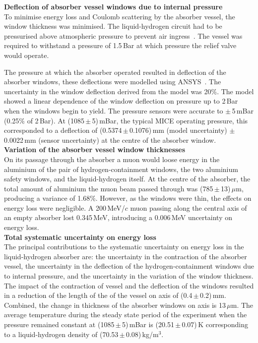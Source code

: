 \noindent\textbf{Deflection of absorber vessel windows due to internal
  pressure} \\
\noindent
To minimise energy loss and Coulomb scattering by the absorber vessel,
the window thickness was minimised.
The liquid-hydrogen circuit had to be pressurised
above atmospheric pressure to prevent air ingress~\cite{1748-0221-13-09-T09008,Ishimoto}. 
The vessel was required to withstand a pressure of 1.5\,Bar at which
pressure the relief valve would operate.

The pressure at which the absorber operated resulted in deflection of
the absorber windows, these deflections were modelled using
ANSYS~\cite{NOTE155}.
The uncertainty in the window deflection derived from the model was
20\%.
The model showed a linear dependence of the window deflection on
pressure up to 2\,Bar when the windows begin to yield.
The pressure sensors were accurate to $\mathrm{\pm}$\,5\,mBar
(0.25\% of 2\,Bar).
At (1085\,$\mathrm{\pm}$\,5)\,mBar, the typical MICE operating
pressure, this corresponded to a deflection of
(0.5374\,$\mathrm{\pm}$\,0.1076)\,mm (model uncertainty)
$\mathrm{\pm}$\,0.0022\,mm (sensor uncertainty) at the centre of the
absorber window. \\

\noindent\textbf{Variation of the absorber vessel window thicknesses} \\
\noindent
On its passage through the absorber a muon would loose energy in the
aluminium of the pair of hydrogen-containment windows, the two
aluminium safety windows, and the liquid-hydrogen itself.
At the centre of the absorber, the total amount of aluminium the muon
beam passed through was (785\,$\mathrm{\pm}$\,13)\,$\mu$m, producing a variance
of 1.68\%.
However, as the windows were thin, the effects on energy loss were
negligible.
A 200\,MeV/$c$ muon passing along the central axis of an empty
absorber lost 0.345\,MeV, introducing a 0.006\,MeV uncertainty
on energy loss.  \\

\noindent\textbf{Total systematic uncertainty on energy loss} \\
\noindent
The principal contributions to the systematic uncertainty on energy
loss in the liquid-hydrogen absorber are: the uncertainty in the
contraction of the absorber vessel, the uncertainty in the deflection
of the hydrogen-containment windows due to internal pressure, and the
uncertainty in the variation of the window thickness.
The impact of the contraction of vessel and the deflection of the
windows resulted in a reduction of the length of the of the vessel on
axis of (0.4\,$\mathrm{\pm}$\,0.2)\,mm.
Combined, the change in thickness of the absorber windows on axis is 13\,$\mu$m.
The average temperature during the steady state period of the
experiment when the pressure remained constant at
(1085\,$\mathrm{\pm}$\,5)\,mBar is (20.51\,$\mathrm{\pm}$\,0.07)\,K 
corresponding to a liquid-hydrogen density of (70.53\,$\mathrm{\pm}$\,0.08)\,kg/m$^{3}$.

